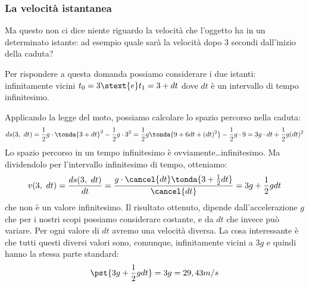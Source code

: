 \subsubsection{La velocità istantanea}
\label{subsubsec:differenziazione_velocita_istantanea}

Ma questo non ci dice niente riguardo la velocità che l'oggetto ha in un 
determinato istante: ad esempio quale sarà la velocità 
dopo 3 secondi dall'inizio della caduta?

Per rispondere a questa domanda possiamo considerare i due istanti: 
infinitamente vicini \(t_0 = 3 \stext{e} t_1 = 3 + dt\) dove \(dt\) è un 
intervallo di tempo infinitesimo.

Applicando la legge del moto, possiamo calcolare lo spazio percorso nella 
caduta: 
\[ds(3,~dt)=\frac{1}{2}g \cdot \tonda{3+dt}^2-\frac{1}{2}g \cdot 3^2= 
\frac{1}{2}g\tonda{9+6 dt+(dt)^2}-\frac{1}{2}g \cdot 9 = 
3 g\cdot dt+\frac{1}{2} g (dt)^2 %
\] 
Lo spazio percorso in un tempo infinitesimo è ovviamente\dots infinitesimo.
Ma dividendolo per l'intervallo infinitesimo di tempo, otteniamo:
\[v(3,~dt)=\frac{ds(3,~dt)}{dt}=
  \frac{g \cdot \cancel{dt} \tonda{3+ \frac{1}{2} dt}}{\cancel{dt}}=
  3g+\frac{1}{2}g dt\] 
che non è un valore infinitesimo. 
Il risultato ottenuto, dipende dall'accelerazione \(g\) che per i nostri 
scopi possiamo considerare costante, e da \(dt\) che invece può variare. Per 
ogni valore di \(dt\) avremo una velocità diversa.
La cosa interessante è che tutti questi diversi valori sono, comunque, 
infinitamente vicini a \(3g\) e quindi hanno la stessa parte standard:
\[\pst{3g+\frac{1}{2}g dt} = 3g = 29,43m/s\]

